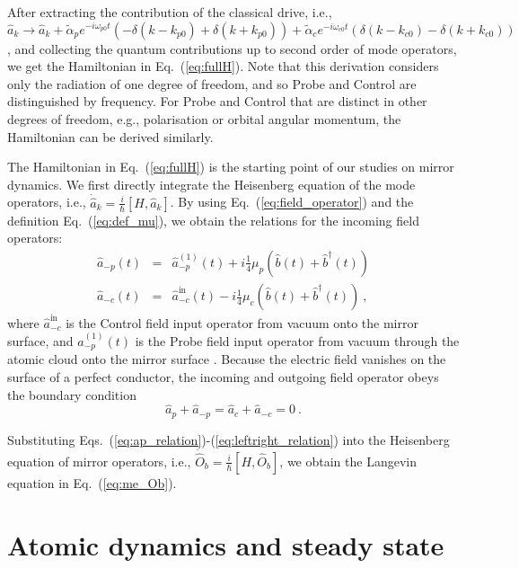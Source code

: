 \documentclass[aps, pra, reprint, amsmath, amssymb, groupedaddress, acknowledgments]{revtex4-1}
\begin{document}
After extracting the contribution of the classical drive, i.e., $\hat{a}_k\rightarrow \hat{a}_k+\tilde{\alpha}_p e^{-i\omega_{p0}t} (-\delta(k-k_{p0})+\delta(k+k_{p0}))+\tilde{\alpha}_c e^{-i\omega_{c0}t} (\delta(k-k_{c0})-\delta(k+k_{c0}))$, and collecting the quantum contributions up to second order of mode operators, we get the Hamiltonian in Eq.~(\ref{eq:fullH}).  Note that this derivation considers only the radiation of one degree of freedom, and so Probe and Control are distinguished by frequency.  For Probe and Control that are distinct in other degrees of freedom, e.g., polarisation or orbital angular momentum, the Hamiltonian can be derived similarly.

The Hamiltonian in Eq.~(\ref{eq:fullH}) is the starting point of our studies on mirror dynamics.  We first directly integrate the Heisenberg equation of the mode operators, i.e., $\dot{\hat{a}}_k=\frac{i}{\hbar}[H,\hat{a}_k]$.  By using Eq.~(\ref{eq:field_operator}) and the definition Eq.~(\ref{eq:def_mu}), we obtain the relations for the incoming field operators:
\begin{eqnarray} \label{eq:ap_relation}
\hat{a}_{-p}(t) &=& \hat{a}^{(1)}_{-p}(t) + i \frac{1}{4} \mu_p \left( \hat{b}(t)+\hat{b}^\dag (t) \right) \\
\hat{a}_{-c}(t) &=& \hat{a}^{\textrm{in}}_{-c}(t) - i \frac{1}{4} \mu_c \left( \hat{b}(t)+\hat{b}^\dag (t) \right)~,\label{eq:ac_relation}
\end{eqnarray}
where $\hat{a}^{\textrm{in}}_{-c}$ is the Control field input operator from vacuum onto the mirror surface, and $\hat{a}^{(1)}_{-p}(t)$ is the Probe field input operator from vacuum through the atomic cloud onto the mirror surface \cite{book:Gardiner_Zoller}.  
Because the electric field vanishes on the surface of a perfect conductor, the incoming and outgoing field operator obeys the boundary condition
\begin{equation}\label{eq:leftright_relation}
\hat{a}_p + \hat{a}_{-p}=\hat{a}_c + \hat{a}_{-c}=0~.
\end{equation}

Substituting Eqs.~(\ref{eq:ap_relation})-(\ref{eq:leftright_relation}) into the Heisenberg equation of mirror operators, i.e., $\dot{\hat{O}}_b=\frac{i}{\hbar}[H,\hat{O}_b]$, we obtain the Langevin equation in Eq.~(\ref{eq:me_Ob}).

\section{Atomic dynamics and steady state \label{app:atom}}
\end{document}
